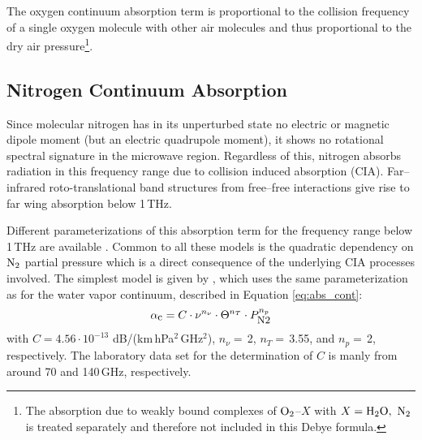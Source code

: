 The oxygen continuum absorption term is proportional to 
the collision frequency of a single oxygen molecule with other air molecules 
and thus proportional to the dry air pressure\footnote{The absorption
  due to weakly bound complexes of $\mbox{O}_2$--$X$ with $X=\mbox{H}_2\mbox{O},~\mbox{N}_2$ is 
  treated separately and therefore not included in this Debye formula.}.




\subsection{Nitrogen Continuum Absorption}
\label{levelc:n2cont}
Since molecular nitrogen has in its unperturbed state no electric or 
magnetic dipole moment (but an electric quadrupole moment), it shows 
no rotational spectral signature in the microwave region. Regardless 
of this, nitrogen absorbs radiation in this frequency range due to 
collision induced absorption (CIA). Far--infrared roto-translational
band structures from free--free interactions give rise to far wing
absorption below 1\,THz.

Different parameterizations of this absorption term for the 
frequency range below 1\,THz are available 
\citet{pwr:93,liebeetal:93,borysow:86}. Common to all these 
models is the quadratic dependency on $\mbox{N}_2$ partial pressure which is 
a direct consequence of the underlying CIA processes involved.
The simplest model is given by \citet{pwr:93}, which uses 
the same parameterization as for the water vapor continuum, described 
in Equation \ref{eq:abs_cont}:
\begin{equation}
  \label{eq:abs_cont_pwr_n2}
    \alpha_{\mbox{\small c}} =  C \cdot \nu^{n_{\nu}} \cdot \Theta^{n_T} \cdot P_{\mbox{\rm \small N2}}^{n_p}
\end{equation}
with $C = 4.56\cdot 10^{-13}$ dB/(km\,hPa$^2$\,GHz$^2$), $n_{\nu}=$\,2, 
$n_T=$\,3.55, and $n_p=$\,2, respectively. The laboratory data set 
for the determination of $C$ is manly from \citet{dagg:75,dagg:78} 
around 70 and 140\,GHz, respectively.

